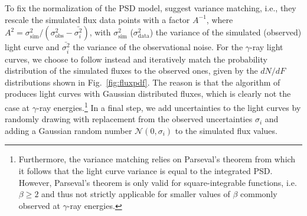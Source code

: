 \documentclass[twocolumn,linenumbers]{aastex62}
\newcommand{\gray}{$\gamma$-ray\xspace}
\begin{document}
To fix the normalization of the PSD model, \citet{2014MNRAS.445..437M} suggest variance matching, i.e., they rescale the simulated flux data points with a factor $A^{-1}$, where $A^2 = \sigma_\mathrm{sim}^2 / (\sigma_\mathrm{obs}^2 - \bar{\sigma_i^2})$, with $\sigma_\mathrm{sim}^2$ ($\sigma_\mathrm{data}^2$) the variance of the simulated (observed) light curve and $\bar{\sigma_i^2}$ the variance of the observational noise.
For the \gray light curves, we choose to follow \citet{2013MNRAS.433..907E} instead and iteratively match the probability distribution of the simulated fluxes to the observed ones, given by the $dN/dF$ distributions shown in Fig.~\ref{fig:fluxpdf}. 
The reason is that the algorithm of \citet{1995A&A...300..707T} produces light curves with Gaussian distributed fluxes, which is clearly not the case at \gray energies.\footnote{Furthermore, the variance matching relies on Parseval's theorem from which it follows that the light curve variance is equal to the integrated PSD. However, Parseval's theorem is only valid for square-integrable functions, i.e. $\beta \geqslant 2$ and thus not strictly applicable for smaller values of $\beta$ commonly observed at \gray energies.}
In a final step, we add uncertainties to the light curves by randomly drawing with replacement from the observed uncertainties $\sigma_i$ and adding a Gaussian random number $\mathcal{N}(0,\sigma_i)$ to the simulated flux values.
\end{document}
